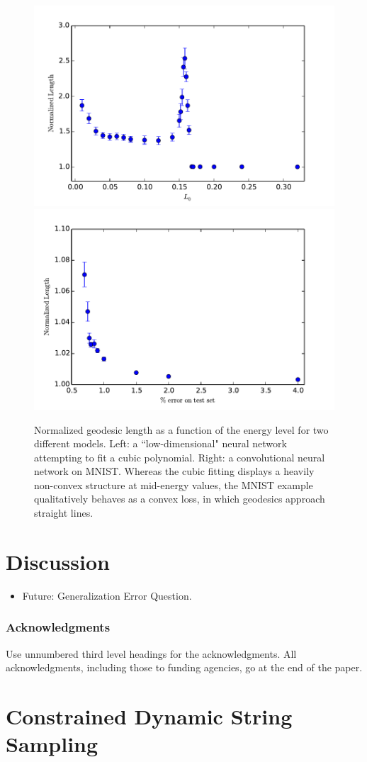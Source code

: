 \documentclass{article} %
\begin{document}
\begin{figure}
\label{figurelength}
\centering
\includegraphics[width=.4\textwidth]{Plots/normlengthcubics}
\includegraphics[width=.4\textwidth]{Plots/normlengthMNIST}
\caption{Normalized geodesic length as a function of the energy level for two different models. Left: a ``low-dimensional" neural network 
attempting to fit a cubic polynomial. Right: a convolutional neural network on MNIST. Whereas the cubic fitting displays a heavily non-convex structure 
at mid-energy values, the MNIST example qualitatively behaves as a convex loss, in which geodesics approach straight lines.}
\end{figure}


\section{Discussion}
\label{sec:Discussion}
\begin{itemize}
\item Future: Generalization Error Question. 

\end{itemize}


\subsubsection*{Acknowledgments}

Use unnumbered third level headings for the acknowledgments. All
acknowledgments, including those to funding agencies, go at the end of the paper.

\appendix

\section{Constrained Dynamic String Sampling}
  \label{sec:ConstrainedAlg}
  
\end{document}
